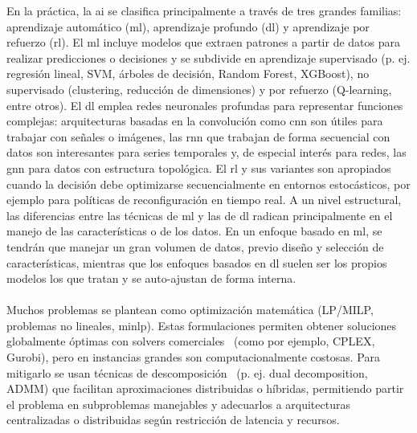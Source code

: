 En la práctica, la \gls{ai} se clasifica principalmente a través de tres grandes familias: aprendizaje automático (\gls{ml}), aprendizaje profundo (\gls{dl}) y aprendizaje por refuerzo (\gls{rl}). El \gls{ml} incluye modelos que extraen patrones a partir de datos para realizar predicciones o decisiones y se subdivide en aprendizaje supervisado (p. ej. regresión lineal, SVM, árboles de decisión, Random Forest, XGBoost), no supervisado (clustering, reducción de dimensiones) y por refuerzo (Q-learning, entre otros). El \gls{dl} emplea redes neuronales profundas para representar funciones complejas: arquitecturas basadas en la convolución como \gls{cnn} son útiles para trabajar con señales o imágenes, las \gls{rnn} que trabajan de forma secuencial con datos son interesantes para series temporales y, de especial interés para redes, las \gls{gnn} para datos con estructura topológica. El \gls{rl} y sus variantes son apropiados cuando la decisión debe optimizarse secuencialmente en entornos estocásticos, por ejemplo para políticas de reconfiguración en tiempo real. A un nivel estructural, las diferencias entre las técnicas de \gls{ml} y las de \gls{dl} radican principalmente en el manejo de las características o de los datos. En un enfoque basado en \gls{ml}, se tendrán que manejar un gran volumen de datos, previo diseño y selección de características, mientras que los enfoques basados en \gls{dl} suelen ser los propios modelos los que tratan y se auto-ajustan de forma interna.\\
\\
Muchos problemas se plantean como optimización matemática (LP/MILP, problemas no lineales, \gls{minlp}). Estas formulaciones permiten obtener soluciones globalmente óptimas con solvers comerciales~\cite{anand2017comparative} (como por ejemplo, CPLEX, Gurobi), pero en instancias grandes son computacionalmente costosas. Para mitigarlo se usan técnicas de descomposición~\cite{tjell2019privacy} (p. ej. dual decomposition, ADMM) que facilitan aproximaciones distribuidas o híbridas, permitiendo partir el problema en subproblemas manejables y adecuarlos a arquitecturas centralizadas o distribuidas según restricción de latencia y recursos. \\
\\
